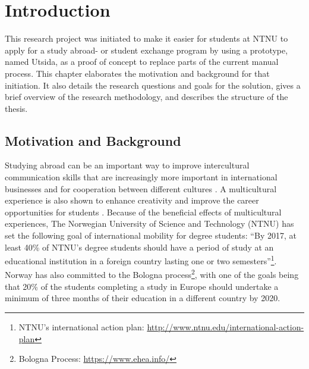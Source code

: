 
\chapter{Introduction}\label{chap:1}

This research project was initiated to make it easier for students at NTNU to apply for a study abroad- or student exchange program by using a prototype, named Utsida, as a proof of concept to replace parts of the current manual process. This chapter elaborates the motivation and background for that initiation. It also details the research questions and goals for the solution, gives a brief overview of the research methodology, and describes the structure of the thesis.

\section{Motivation and Background}
Studying abroad can be an important way to improve intercultural communication skills that are increasingly more important in international businesses and for cooperation between different cultures \cite{williams2005exploring}. A multicultural experience is also shown to enhance creativity \cite{leung2008multicultural} and improve the career opportunities for students \cite{brandenburg2014erasmus}. Because of the beneficial effects of multicultural experiences, The Norwegian University of Science and Technology (NTNU) has set the following goal of international mobility for degree students: \enquote{By 2017, at least 40\% of NTNU's degree students should have a period of study at an educational institution in a foreign country lasting one or two semesters}\footnote{NTNU's international action plan: \url{http://www.ntnu.edu/international-action-plan}}. Norway has also committed to the Bologna process\footnote{Bologna Process: \url{https://www.ehea.info/}}, with one of the goals being that 20\% of the students completing a study in Europe should undertake a minimum of three months of their education in a different country by 2020.

